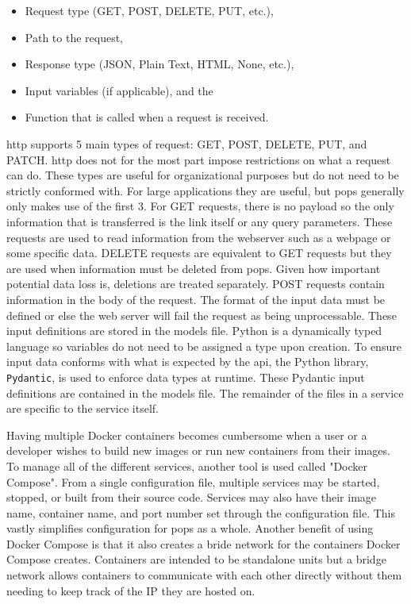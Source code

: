 \begin{itemize}
    \item Request type (GET, POST, DELETE, PUT, etc.), 
    \item Path to the request, 
    \item Response type (JSON, Plain Text, HTML, None, etc.), 
    \item Input variables (if applicable), and the 
    \item Function that is called when a request is received.
\end{itemize}

\gls{http} supports 5 main types of request: GET, POST, DELETE, PUT, and PATCH.
\gls{http} does not for the most part impose restrictions on what a request can
do. These types are useful for organizational purposes but do not need to be
strictly conformed with. For large applications they are useful, but \gls{pops}
generally only makes use of the first 3.  For GET requests, there is no payload
so the only information that is transferred is the link itself or any query
parameters.  These requests are used to read information from the webserver
such as a webpage or some specific data. DELETE requests are equivalent to GET
requests but they are used when information must be deleted from \gls{pops}.
Given how important potential data loss is, deletions are treated separately.
POST requests contain information in the body of the request.  The format of
the input data must be defined or else the web server will fail the request as
being unprocessable.  These input definitions are stored in the models file.
Python is a dynamically typed language so variables do not need to be assigned
a type upon creation. To ensure input data conforms with what is expected by
the \gls{api}, the Python library, \texttt{Pydantic}, is used to enforce data
types at runtime.  These Pydantic input definitions are contained in the models
file.  The remainder of the files in a service are specific to the service
itself.

Having multiple Docker containers becomes cumbersome when a user or a developer
wishes to build new images or run new containers from their images. To manage
all of the different services, another tool is used called "Docker Compose".
From a single configuration file, multiple services may be started, stopped, or
built from their source code. Services may also have their image name,
container name, and port number set through the configuration file. This vastly
simplifies configuration for \gls{pops} as a whole. Another benefit of using
Docker Compose is that it also creates a bride network for the containers
Docker Compose creates. Containers are intended to be standalone units but a
bridge network allows containers to communicate with each other directly
without them needing to keep track of the IP they are hosted on.

